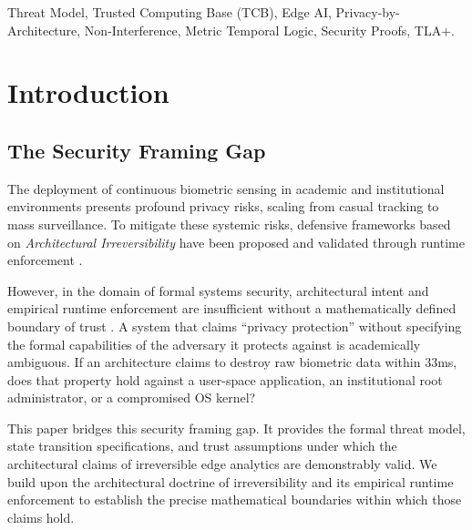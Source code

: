 \documentclass[conference]{IEEEtran}
\begin{document}
\begin{IEEEkeywords}
Threat Model, Trusted Computing Base (TCB), Edge AI, Privacy-by-Architecture, Non-Interference, Metric Temporal Logic, Security Proofs, TLA+.
\end{IEEEkeywords}

\section{Introduction}

\subsection{The Security Framing Gap}
The deployment of continuous biometric sensing in academic and institutional environments presents profound privacy risks, scaling from casual tracking to mass surveillance. To mitigate these systemic risks, defensive frameworks based on \textit{Architectural Irreversibility} \cite{b25_irrev} have been proposed and validated through runtime enforcement \cite{b26_runtime}. 

However, in the domain of formal systems security, architectural intent and empirical runtime enforcement are insufficient without a mathematically defined boundary of trust \cite{b1}. A system that claims ``privacy protection'' without specifying the formal capabilities of the adversary it protects against is academically ambiguous. If an architecture claims to destroy raw biometric data within $33$ms, does that property hold against a user-space application, an institutional root administrator, or a compromised OS kernel? 

This paper bridges this security framing gap. It provides the formal threat model, state transition specifications, and trust assumptions under which the architectural claims of irreversible edge analytics are demonstrably valid. We build upon the architectural doctrine of irreversibility \cite{b25_irrev} and its empirical runtime enforcement \cite{b26_runtime} to establish the precise mathematical boundaries within which those claims hold.
\end{document}
